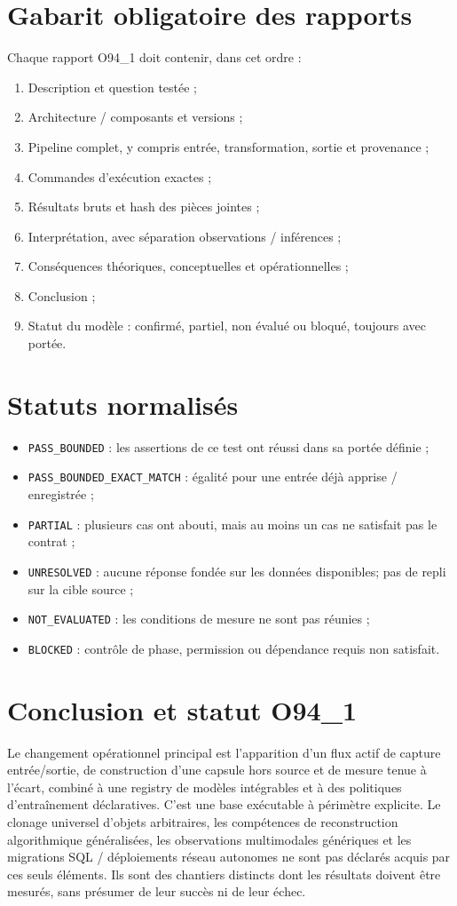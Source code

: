 \documentclass[11pt,a4paper]{article}
\begin{document}
\section{Gabarit obligatoire des rapports}
Chaque rapport O94\_1 doit contenir, dans cet ordre :
\begin{enumerate}[nosep]
\item Description et question testée ;
\item Architecture / composants et versions ;
\item Pipeline complet, y compris entrée, transformation, sortie et provenance ;
\item Commandes d'exécution exactes ;
\item Résultats bruts et hash des pièces jointes ;
\item Interprétation, avec séparation observations / inférences ;
\item Conséquences théoriques, conceptuelles et opérationnelles ;
\item Conclusion ;
\item Statut du modèle : confirmé, partiel, non évalué ou bloqué, toujours avec portée.
\end{enumerate}

\section{Statuts normalisés}
\begin{itemize}[nosep]
\item \texttt{PASS\_BOUNDED} : les assertions de ce test ont réussi dans sa portée définie ;
\item \texttt{PASS\_BOUNDED\_EXACT\_MATCH} : égalité pour une entrée déjà apprise / enregistrée ;
\item \texttt{PARTIAL} : plusieurs cas ont abouti, mais au moins un cas ne satisfait pas le contrat ;
\item \texttt{UNRESOLVED} : aucune réponse fondée sur les données disponibles; pas de repli sur la cible source ;
\item \texttt{NOT\_EVALUATED} : les conditions de mesure ne sont pas réunies ;
\item \texttt{BLOCKED} : contrôle de phase, permission ou dépendance requis non satisfait.
\end{itemize}

\section{Conclusion et statut O94\_1}
Le changement opérationnel principal est l'apparition d'un flux actif de capture entrée/sortie, de construction d'une capsule hors source et de mesure tenue à l'écart, combiné à une registry de modèles intégrables et à des politiques d'entraînement déclaratives. C'est une base exécutable à périmètre explicite. Le clonage universel d'objets arbitraires, les compétences de reconstruction algorithmique généralisées, les observations multimodales génériques et les migrations SQL / déploiements réseau autonomes ne sont pas déclarés acquis par ces seuls éléments. Ils sont des chantiers distincts dont les résultats doivent être mesurés, sans présumer de leur succès ni de leur échec.
\end{document}
